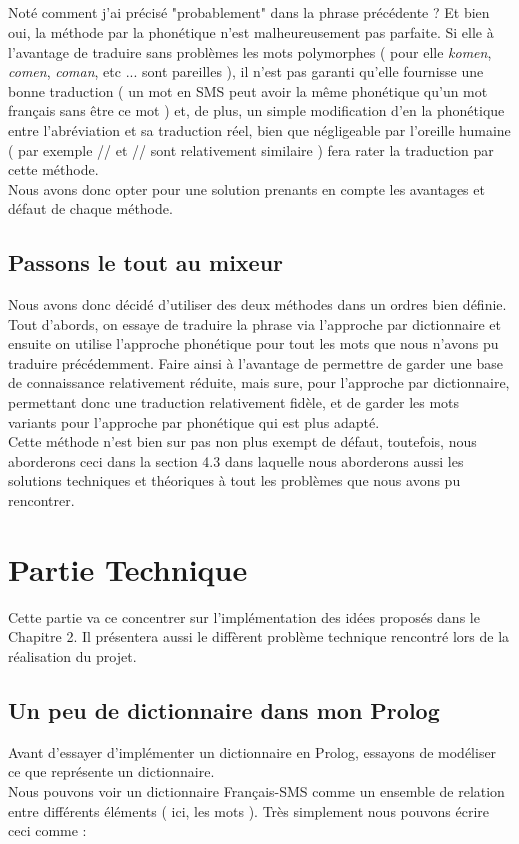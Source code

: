 \documentclass[11pt]{book}
\begin{document}
	\paragraph{} Noté comment j'ai précisé "probablement" dans la phrase précédente ? Et bien oui, la méthode par la phonétique n'est malheureusement pas parfaite. Si elle à l'avantage de traduire sans problèmes les mots polymorphes ( pour elle {\em komen}, {\em comen}, {\em coman}, etc ... sont pareilles ), il n'est pas garanti qu'elle fournisse une bonne traduction ( un mot en SMS peut avoir la même phonétique qu'un mot français sans être ce mot ) et, de plus, un simple modification d'en la phonétique entre l'abréviation et sa traduction réel, bien que négligeable par l'oreille humaine ( par exemple // et // sont relativement similaire ) fera rater la traduction par cette méthode.\\
	Nous avons donc opter pour une solution prenants en compte les avantages et défaut de chaque méthode.
	
	\section{Passons le tout au mixeur}
	Nous avons donc décidé d'utiliser des deux méthodes dans un ordres bien définie. Tout d'abords, on essaye de traduire la phrase via l'approche par dictionnaire et ensuite on utilise l'approche phonétique pour tout les mots que nous n'avons pu traduire précédemment. Faire ainsi à l'avantage de permettre de garder une base de connaissance relativement réduite, mais sure, pour l'approche par dictionnaire, permettant donc une traduction relativement fidèle, et de garder les mots variants pour l'approche par phonétique qui est plus adapté.\\
	Cette méthode n'est bien sur pas non plus exempt de défaut, toutefois, nous aborderons ceci dans la section 4.3 dans laquelle nous aborderons aussi les solutions techniques et théoriques à tout les problèmes que nous avons pu rencontrer.

\chapter{Partie Technique}
Cette partie va ce concentrer sur l'implémentation des idées proposés dans le Chapitre 2. Il présentera aussi le diffèrent problème technique rencontré lors de la réalisation du projet.

	\section{Un peu de dictionnaire dans mon Prolog}
	Avant d'essayer d'implémenter un dictionnaire en Prolog, essayons de modéliser ce que représente un dictionnaire.\\
	Nous pouvons voir un dictionnaire Français-SMS comme un ensemble de relation entre différents éléments ( ici, les mots ). Très simplement nous pouvons écrire ceci comme :\\
	\smallskip
	
\end{document}
